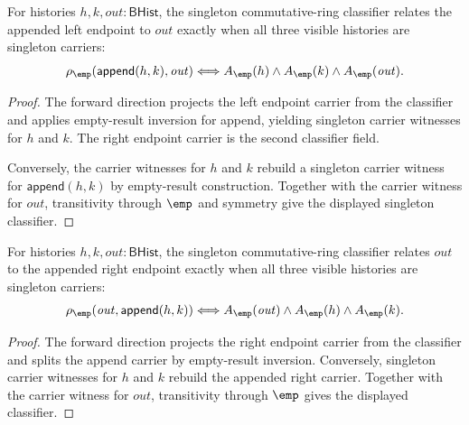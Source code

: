 \begin{theorem}
\label{thm:commring-singleton-classifier-append-left-carrier-iff}
For histories $h,k,\mathit{out}:\mathsf{BHist}$, the singleton
commutative-ring classifier relates the appended left endpoint to
$\mathit{out}$ exactly when all three visible histories are singleton
carriers:
$$
\rho_{\emp}(\mathsf{append}(h,k),\mathit{out})
\Longleftrightarrow
A_{\emp}(h)\land A_{\emp}(k)\land A_{\emp}(\mathit{out}).
$$
\end{theorem}
\begin{proof}
The forward direction projects the left endpoint carrier from the classifier
and applies empty-result inversion for append, yielding singleton carrier
witnesses for $h$ and $k$. The right endpoint carrier is the second classifier
field.

Conversely, the carrier witnesses for $h$ and $k$ rebuild a singleton carrier
witness for $\mathsf{append}(h,k)$ by empty-result construction. Together with
the carrier witness for $\mathit{out}$, transitivity through $\emp$ and symmetry
give the displayed singleton classifier.
\end{proof}

\begin{theorem}
\label{thm:commring-singleton-classifier-append-right-carrier-iff}
For histories $h,k,\mathit{out}:\mathsf{BHist}$, the singleton
commutative-ring classifier relates $\mathit{out}$ to the appended right
endpoint exactly when all three visible histories are singleton carriers:
$$
\rho_{\emp}(\mathit{out},\mathsf{append}(h,k))
\Longleftrightarrow
A_{\emp}(\mathit{out})\land A_{\emp}(h)\land A_{\emp}(k).
$$
\end{theorem}
\begin{proof}
The forward direction projects the right endpoint carrier from the classifier
and splits the append carrier by empty-result inversion. Conversely, singleton
carrier witnesses for $h$ and $k$ rebuild the appended right carrier. Together
with the carrier witness for $\mathit{out}$, transitivity through $\emp$ gives
the displayed classifier.
\end{proof}

